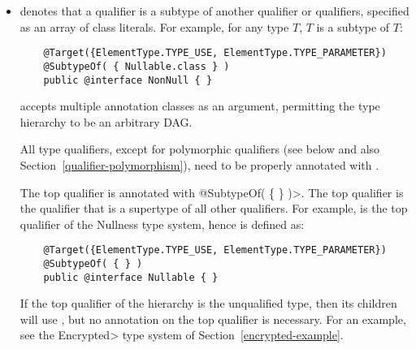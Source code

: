 \begin{itemize}

\item {} denotes that a qualifier is a subtype of
  another qualifier or qualifiers, specified as an array of class
  literals.  For example, for any type $T$,
   $T$ is a subtype of  $T$:

  \begin{Verbatim}
    @Target({ElementType.TYPE_USE, ElementType.TYPE_PARAMETER})
    @SubtypeOf( { Nullable.class } )
    public @interface NonNull { }
  \end{Verbatim}



   accepts multiple annotation classes as an argument,
  permitting the type hierarchy to be an arbitrary DAG\@.


  All type qualifiers, except for polymorphic qualifiers (see below and
  also Section~\ref{qualifier-polymorphism}), need to be
  properly annotated with .

  The top qualifier is annotated with
  \<@SubtypeOf( \{ \} )>.  The top qualifier is the qualifier that is
  a supertype of all other qualifiers.  For example, 
  is the top qualifier of the Nullness type system, hence is defined as:

  \begin{Verbatim}
    @Target({ElementType.TYPE_USE, ElementType.TYPE_PARAMETER})
    @SubtypeOf( { } )
    public @interface Nullable { }
  \end{Verbatim}

  \begin{sloppypar}
  If the top qualifier of the hierarchy is the unqualified type, then its children
  will use , but no  annotation on the top qualifier is necessary.  For an example, see the
  \<Encrypted> type system of Section~\ref{encrypted-example}.
  \end{sloppypar}


\end{itemize}
